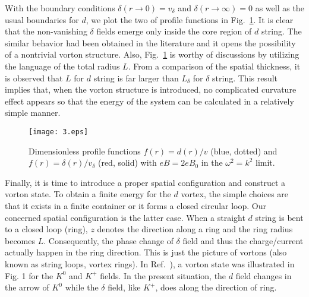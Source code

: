 With the boundary conditions $\delta(r \rightarrow 0) = v_\delta$ and $\delta(r \rightarrow \infty) = 0$
as well as the usual boundaries for $d$, we plot the two of profile functions in Fig.~\ref{fig:3}.
It is clear that the non-vanishing $\delta$ fields emerge only inside the core region of $d$ string.
The similar behavior had been obtained in the literature and it opens the possibility of a nontrivial
vorton structure. Also, Fig.~\ref{fig:3} is worthy of discussions by utilizing the language of the
total radius $L$.
From a comparison of the spatial thickness, it is observed that $L$ for $d$ string is far larger than
$L_\delta$ for $\delta$ string. This result implies that, when the vorton structure is introduced, no
complicated curvature effect appears so that the energy of the system can be calculated in a relatively
simple manner.

\begin{figure}[ht]
\centering
\texttt{[image: 3.eps]}
	\caption{Dimensionless profile functions $f(r)=d(r)/v$ (blue,
    dotted) and $f(r)=\delta(r)/v_\delta$ (red, solid) with $eB= 2 eB_0$ in the $\omega^2 = k^2$ limit.
     }
	\label{fig:3}
\end{figure}

Finally, it is time to introduce a proper spatial configuration and construct a vorton state.
To obtain a finite energy for the $d$ vortex, the simple choices are that it exists in a finite
container or it forms a closed circular loop.
Our concerned spatial configuration is the latter case. When a straight $d$ string is bent to a
closed loop (ring), $z$ denotes the direction along a ring and the ring radius becomes $L$.
Consequently, the phase change of $\delta$ field and thus the charge/current actually happen in
the ring direction. This is just the picture of vortons (also known as string loops, vortex rings).
In Ref.~\cite{bedaque2011vortons}), a vorton state was illustrated in Fig. 1 for the $K^0$ and
$K^+$ fields. In the present situation, the $d$ field changes in the arrow of $K^0$ while the
$\delta$ field, like $K^+$, does along the direction of ring.

